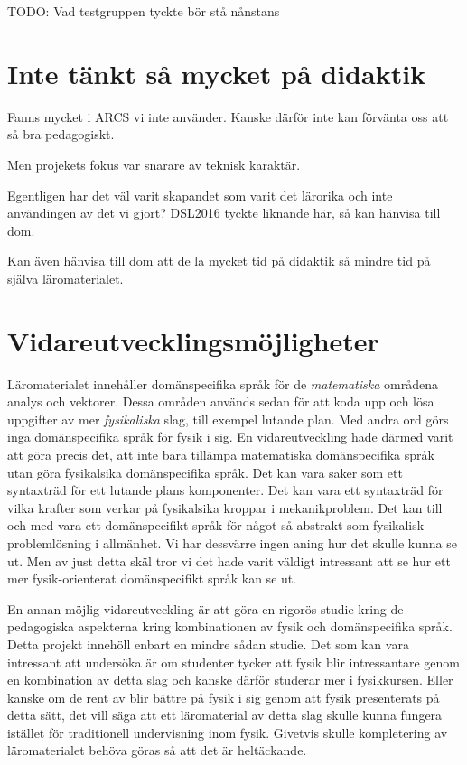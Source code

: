 \begin{binge}
TODO: Vad testgruppen tyckte bör stå nånstans

\section{Inte tänkt så mycket på didaktik}

Fanns mycket i ARCS vi inte använder. Kanske därför inte kan förvänta oss att så bra pedagogiskt.

Men projekets fokus var snarare av teknisk karaktär.

Egentligen har det väl varit skapandet som varit det lärorika och inte användingen av det vi gjort? DSL2016 tyckte liknande här, så kan hänvisa till dom.

Kan även hänvisa till dom att de la mycket tid på didaktik så mindre tid på själva läromaterialet.

\section{Vidareutvecklingsmöjligheter}

Läromaterialet innehåller domänspecifika språk för de \textit{matematiska} områdena analys och vektorer. Dessa områden används sedan för att koda upp och lösa uppgifter av mer \textit{fysikaliska} slag, till exempel lutande plan. Med andra ord görs inga domänspecifika språk för fysik i sig. En vidareutveckling hade därmed varit att göra precis det, att inte bara tillämpa matematiska domänspecifika språk utan göra fysikalsika domänspecifika språk. Det kan vara saker som ett syntaxträd för ett lutande plans komponenter. Det kan vara ett syntaxträd för vilka krafter som verkar på fysikalsika kroppar i mekanikproblem. Det kan till och med vara ett domänspecifikt språk för något så abstrakt som fysikalisk problemlösning i allmänhet. Vi har dessvärre ingen aning hur det skulle kunna se ut. Men av just detta skäl tror vi det hade varit väldigt intressant att se hur ett mer fysik-orienterat domänspecifikt språk kan se ut.

En annan möjlig vidareutveckling är att göra en rigorös studie kring de pedagogiska aspekterna kring kombinationen av fysik och domänspecifika språk. Detta projekt innehöll enbart en mindre sådan studie. Det som kan vara intressant att undersöka är om studenter tycker att fysik blir intressantare genom en kombination av detta slag och kanske därför studerar mer i fysikkursen. Eller kanske om de rent av blir bättre på fysik i sig genom att fysik presenterats på detta sätt, det vill säga att ett läromaterial av detta slag skulle kunna fungera istället för traditionell undervisning inom fysik. Givetvis skulle kompletering av läromaterialet behöva göras så att det är heltäckande.


\end{binge}
